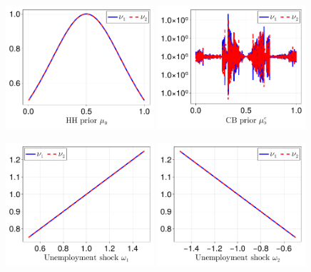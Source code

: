 \documentclass[12pt,a4paper]{article}
\begin{document}
\begin{figure}[H]
\centering
\includegraphics[width=0.49\textwidth]{figures/V9/γ=1.0-μ_0=0.5-α=0.0/fig_optimal_ν_by_μ_0.pdf}
\includegraphics[width=0.49\textwidth]{figures/V9/γ=1.0-μ_0=0.5-α=0.0/fig_optimal_ν_by_μ_0_c.pdf}
\end{figure}

\begin{figure}[H]
\centering
\includegraphics[width=0.49\textwidth]{figures/V9/γ=1.0-μ_0=0.5-α=0.0/fig_optimal_ν_by_ω_1.pdf}
\includegraphics[width=0.49\textwidth]{figures/V9/γ=1.0-μ_0=0.5-α=0.0/fig_optimal_ν_by_ω_2.pdf}
\end{figure}
\end{document}
